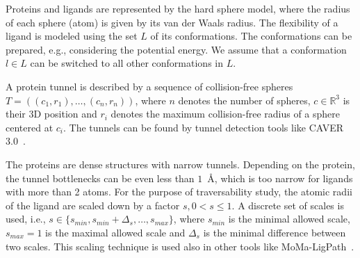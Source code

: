 \documentclass{svmult}
\def\R{\mathbb{R}}
\def\smin{s_{min}}
\def\smax{s_{max}}
\def\sdelta{{\Delta}_s}
\def\L{L}
\begin{document}
Proteins and ligands are represented by the hard sphere model, where the radius of each sphere (atom) is given by its van der Waals radius.
The flexibility of a ligand is modeled using the set $\L$ of its conformations.
The conformations can be prepared, e.g., considering the potential energy.
We assume that a conformation $l \in \L$ can be switched to all other conformations in $\L$.


A protein tunnel is described by a sequence of collision-free spheres 
$T=( (c_1, r_1),\ldots,(c_n,r_n) )$, where $n$ denotes the number of spheres,
$c \in \R^3$ is their 3D position and $r_i$ denotes the maximum collision-free radius of a sphere centered at $c_i$. 
The tunnels can be found by tunnel detection tools like CAVER 3.0~\cite{caver3}.



The proteins are dense structures with narrow tunnels.
Depending on the protein, the tunnel bottlenecks can be even less than $1$~\AA, which is too narrow for ligands with more than 2 atoms.
For the purpose of traversability study, the atomic radii of the ligand are scaled down by a factor $s, 0 < s \le 1$.
A discrete set of scales is used, i.e., $s \in \{\smin, \smin+\sdelta, \ldots, \smax\}$, where 
$\smin$ is the minimal allowed scale, $\smax=1$ is the maximal allowed scale and $\sdelta$ is the minimal difference between two scales.
This scaling technique is used also in other tools like MoMa-LigPath~\cite{cortes2005path}.
\end{document}
